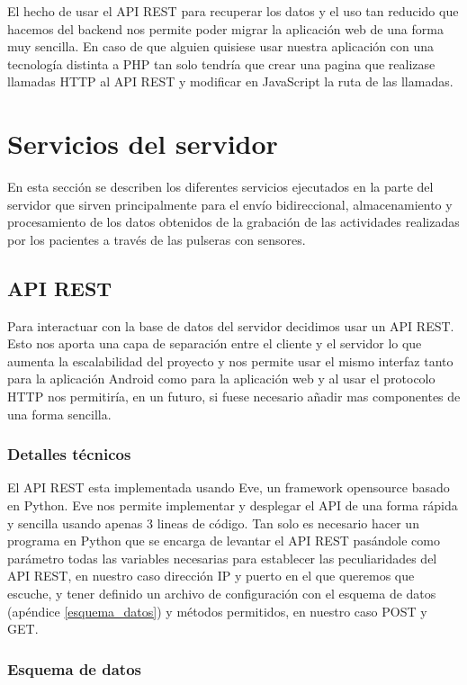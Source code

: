 \documentclass[11pt,spanish]{article}
\begin{document}
El hecho de usar el API REST para recuperar los datos y el uso tan reducido que hacemos del backend nos permite poder migrar la aplicación web de una forma muy sencilla. En caso de que alguien quisiese usar nuestra aplicación con una tecnología distinta a PHP tan solo tendría que crear una pagina que realizase llamadas HTTP al API REST y modificar en JavaScript la ruta de las llamadas.
\newpage


\section{Servicios del servidor}
En esta sección se describen los diferentes servicios ejecutados en la parte del servidor que sirven principalmente para el envío bidireccional, almacenamiento y procesamiento de los datos obtenidos de la grabación de las actividades realizadas por los pacientes a través de las pulseras con sensores.

\subsection{API REST}
Para interactuar con la base de datos del servidor decidimos usar un API REST. Esto nos aporta una capa de separación entre el cliente y el servidor lo que aumenta la escalabilidad del proyecto y nos permite usar el mismo interfaz tanto para la aplicación Android como para la aplicación web y al usar el protocolo HTTP nos permitiría, en un futuro, si fuese necesario añadir mas componentes de una forma sencilla.

\subsubsection{Detalles técnicos}
El API REST esta implementada usando Eve, un framework opensource basado en Python. Eve nos permite implementar y desplegar el API de una forma rápida y sencilla usando apenas 3 lineas de código. Tan solo es necesario hacer un programa en Python que se encarga de levantar el API REST pasándole como parámetro todas las variables necesarias para establecer las peculiaridades del API REST, en nuestro caso dirección IP y puerto en el que queremos que escuche, y tener definido un archivo de configuración con el esquema de datos (apéndice \ref{esquema_datos}) y métodos permitidos, en nuestro caso POST y GET.

\subsubsection{Esquema de datos}
\end{document}
